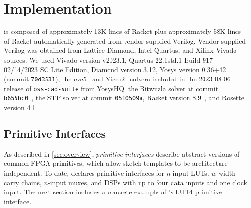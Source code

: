 \section{Implementation}
\label{sec:implementation}


\lr is composed of
  approximately 13K lines of Racket
  plus approximately 58K lines
  of Racket
  automatically generated from 
  vendor-supplied Verilog.
Vendor-supplied Verilog
  was obtained from Lattice Diamond,
  Intel Quartus,
  and Xilinx Vivado
  sources.
We used Vivado version v2023.1,
  Quartus 22.1std.1 Build 917 02/14/2023 SC Lite Edition,
  Diamond version 3.12,
  Yosys version 0.36+42 (commit \texttt{70d3531}),
  the cvc5~\cite{barbosa22cvc5} and Yices2~\cite{dutertre2006yices,dutertre2014yices}
  solvers
  included in the 2023-08-06 release of \texttt{oss-cad-suite} from YosysHQ,
  the Bitwuzla solver at commit \texttt{b655bc0}~\cite{bitwuzla},
  the STP solver at commit \texttt{0510509a},
  Racket version 8.9~\cite{racket,racket:ref},
  and Rosette version 4.1~\cite{rosette4}.

\subsection{Primitive Interfaces}
\label{sec:impl-primitive-interfaces}

As described in \cref{sec:overview},
\textit{primitive interfaces}
  describe abstract versions
  of common FPGA primitives,
  which allow sketch templates
  to be architecture-independent.
To date, \lr declares primitive interfaces for
  $n$-input LUTs, $w$-width carry chains, 
  $n$-input muxes,
  and DSPs with up to four data inputs and one clock input.
The next section includes a concrete example
  of \lr's LUT4 primitive interface.\tighten



